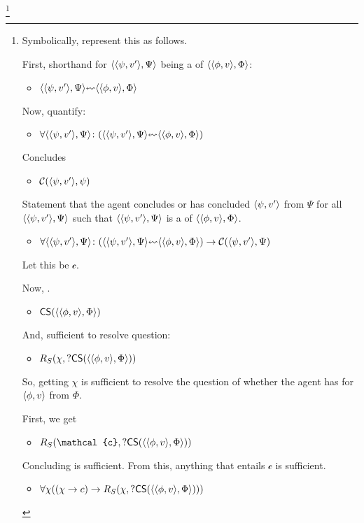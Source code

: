 \begin{note}
  \footnote{
    Symbolically, represent this as follows.

    First, shorthand for \(\langle \langle \psi, v' \rangle, \Psi \rangle\) being a \requ{} of \(\langle \langle \phi, v \rangle, \Phi \rangle\):
    \begin{itemize}
    \item \(\pvp{\psi}{v'}{\Psi} \rleadsto \pvp{\phi}{v}{\Phi}\)
    \end{itemize}
    Now, quantify:
    \begin{itemize}
    \item \(\forall \pvp{\psi}{v'}{\Psi}\colon (\pvp{\psi}{v'}{\Psi} \rleadsto \pvp{\phi}{v}{\Phi})\)
    \end{itemize}
    Concludes
    \begin{itemize}
    \item \(\mathcal{C}(\langle \psi, v' \rangle,\psi)\)
    \end{itemize}
    Statement that the agent concludes or has concluded \(\langle \psi, v' \rangle\) from \(\Psi\) for all \(\langle \langle \psi, v' \rangle, \Psi \rangle\) such that \(\langle \langle \psi, v' \rangle, \Psi \rangle\) is a \requ{} of \(\langle \langle \phi, v \rangle, \Phi \rangle\).
    \begin{itemize}
    \item \(\forall \pvp{\psi}{v'}{\Psi}\colon (\pvp{\psi}{v'}{\Psi} \rleadsto \pvp{\phi}{v}{\Phi}) \rightarrow \mathcal{C}(\pv{\psi}{v'},\Psi)\)
    \end{itemize}
    Let this be \(\mathcal{c}\).

    Now, \csN{}.
    \begin{itemize}
    \item \(\mathsf{CS}(\langle \langle \phi, v \rangle, \Phi \rangle)\)
    \end{itemize}
    And, sufficient to resolve question:
    \begin{itemize}
    \item \(R_{S}(\chi,?\mathsf{CS}(\langle \langle \phi, v \rangle, \Phi \rangle))\)
    \end{itemize}
    So, getting \(\chi\) is sufficient to resolve the question of whether the agent has \csVed{} for \(\langle \phi, v \rangle\) from \(\Phi\).

    First, we get
    \begin{itemize}
    \item \(R_{S}(\mathcal{c},?\mathsf{CS}(\pvp{\phi}{v}{\Phi}))\)
    \end{itemize}
    Concluding is sufficient.
    From this, anything that entails \(\mathcal{c}\) is sufficient.

    \begin{itemize}
    \item \(\forall \chi((\chi \rightarrow c) \rightarrow R_{S}(\chi,?\mathsf{CS}(\langle \langle \phi, v \rangle, \Phi \rangle)))\)
    \end{itemize}

}
\end{note}
